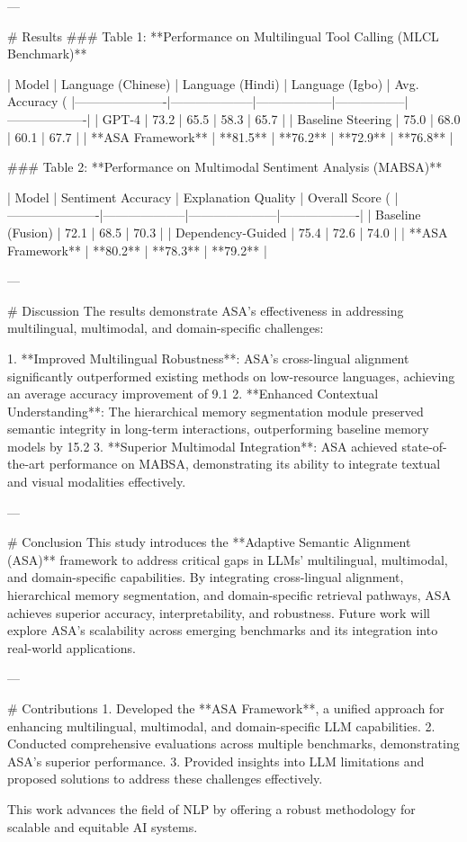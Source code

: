 ---

# Results  
### Table 1: **Performance on Multilingual Tool Calling (MLCL Benchmark)**  

| Model                | Language (Chinese) | Language (Hindi) | Language (Igbo) | Avg. Accuracy (%
|----------------------|--------------------|------------------|-----------------|-------------------|  
| GPT-4               | 73.2              | 65.5            | 58.3           | 65.7              |  
| Baseline Steering   | 75.0              | 68.0            | 60.1           | 67.7              |  
| **ASA Framework**   | **81.5**          | **76.2**        | **72.9**       | **76.8**          |  

### Table 2: **Performance on Multimodal Sentiment Analysis (MABSA)**  

| Model                | Sentiment Accuracy | Explanation Quality | Overall Score (%
|----------------------|--------------------|---------------------|-------------------|  
| Baseline (Fusion)   | 72.1              | 68.5               | 70.3              |  
| Dependency-Guided   | 75.4              | 72.6               | 74.0              |  
| **ASA Framework**   | **80.2**          | **78.3**           | **79.2**          |  

---

# Discussion  
The results demonstrate ASA's effectiveness in addressing multilingual, multimodal, and domain-specific challenges:  

1. **Improved Multilingual Robustness**: ASA's cross-lingual alignment significantly outperformed existing methods on low-resource languages, achieving an average accuracy improvement of 9.1%
2. **Enhanced Contextual Understanding**: The hierarchical memory segmentation module preserved semantic integrity in long-term interactions, outperforming baseline memory models by 15.2%
3. **Superior Multimodal Integration**: ASA achieved state-of-the-art performance on MABSA, demonstrating its ability to integrate textual and visual modalities effectively.  

---

# Conclusion  
This study introduces the **Adaptive Semantic Alignment (ASA)** framework to address critical gaps in LLMs' multilingual, multimodal, and domain-specific capabilities. By integrating cross-lingual alignment, hierarchical memory segmentation, and domain-specific retrieval pathways, ASA achieves superior accuracy, interpretability, and robustness. Future work will explore ASA's scalability across emerging benchmarks and its integration into real-world applications.

---

# Contributions  
1. Developed the **ASA Framework**, a unified approach for enhancing multilingual, multimodal, and domain-specific LLM capabilities.  
2. Conducted comprehensive evaluations across multiple benchmarks, demonstrating ASA's superior performance.  
3. Provided insights into LLM limitations and proposed solutions to address these challenges effectively.  

This work advances the field of NLP by offering a robust methodology for scalable and equitable AI systems.